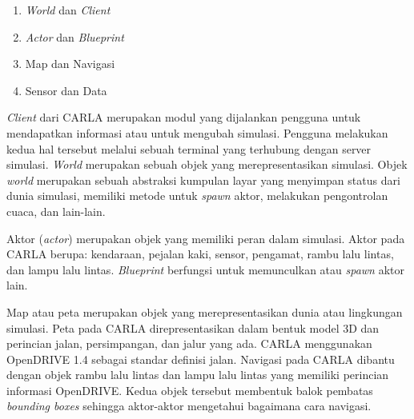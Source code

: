 \begin{enumerate}

    \item \textit{World} dan \textit{Client}
    \item \textit{Actor} dan \textit{Blueprint}
    \item Map dan Navigasi
    \item Sensor dan Data

\end{enumerate}


\textit{Client} dari CARLA merupakan modul yang dijalankan pengguna untuk
mendapatkan informasi atau untuk mengubah simulasi. Pengguna melakukan kedua hal
tersebut melalui sebuah terminal yang terhubung dengan server simulasi.
\textit{World} merupakan sebuah objek yang merepresentasikan simulasi. Objek
\textit{world} merupakan sebuah abstraksi kumpulan layar yang menyimpan status
dari dunia simulasi, memiliki metode untuk \textit{spawn} aktor, melakukan
pengontrolan cuaca, dan lain-lain.


Aktor (\textit{actor}) merupakan objek yang memiliki peran dalam simulasi. Aktor
pada CARLA berupa: kendaraan, pejalan kaki, sensor, pengamat, rambu lalu lintas,
dan lampu lalu lintas. \textit{Blueprint} berfungsi untuk memunculkan atau
\textit{spawn} aktor lain.


Map atau peta merupakan objek yang merepresentasikan dunia atau lingkungan
simulasi. Peta pada CARLA direpresentasikan dalam bentuk model 3D dan perincian
jalan, persimpangan, dan jalur yang ada. CARLA menggunakan OpenDRIVE 1.4 sebagai
standar definisi jalan. Navigasi pada CARLA dibantu dengan objek rambu lalu
lintas dan lampu lalu lintas yang memiliki perincian informasi OpenDRIVE. Kedua
objek tersebut membentuk balok pembatas \textit{bounding boxes} sehingga
aktor-aktor mengetahui bagaimana cara navigasi.

